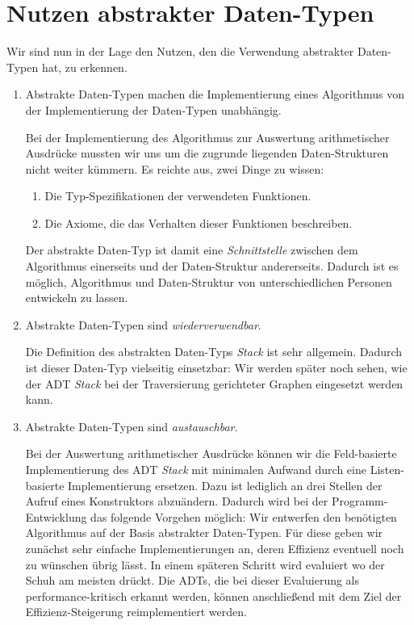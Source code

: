 \section{Nutzen abstrakter Daten-Typen}
Wir sind nun in der Lage den Nutzen, den die Verwendung abstrakter Daten-Typen hat, zu
erkennen. 
\begin{enumerate}
\item Abstrakte Daten-Typen machen die Implementierung eines Algorithmus von der
      Implementierung der Daten-Typen unabh\"angig.

      Bei der Implementierung des Algorithmus zur Auswertung arithmetischer Ausdr\"ucke
      mussten wir uns um die zugrunde liegenden Daten-Strukturen nicht weiter k\"ummern. 
      Es reichte aus, zwei Dinge zu wissen: 
      \begin{enumerate}
      \item Die Typ-Spezifikationen der verwendeten Funktionen.
      \item Die Axiome, die das Verhalten dieser Funktionen beschreiben.
      \end{enumerate}
      Der abstrakte Daten-Typ ist damit eine \emph{Schnittstelle} zwischen dem Algorithmus
      einerseits und der Daten-Struktur andererseits.  Dadurch ist es m\"oglich, Algorithmus
      und Daten-Struktur von unterschiedlichen Personen entwickeln zu lassen.
\item Abstrakte Daten-Typen sind \emph{wiederverwendbar}.

      Die Definition des abstrakten Daten-Typs \emph{Stack} ist sehr allgemein. Dadurch
      ist dieser Daten-Typ vielseitig einsetzbar:  Wir werden sp\"ater noch sehen, wie der
      ADT \emph{Stack} bei der Traversierung gerichteter Graphen eingesetzt werden kann.
\item Abstrakte Daten-Typen sind \emph{austauschbar}.

      Bei der Auswertung arithmetischer Ausdr\"ucke k\"onnen wir die
      Feld-basierte Implementierung des ADT \emph{Stack} mit minimalen Aufwand durch 
      eine Listen-basierte Implementierung ersetzen.  Dazu ist lediglich an drei Stellen
      der Aufruf eines Konstruktors abzu\"andern.
      Dadurch wird bei der
      Programm-Entwicklung das folgende Vorgehen m\"oglich: Wir entwerfen den ben\"otigten
      Algorithmus auf der Basis abstrakter Daten-Typen.  F\"ur diese geben wir zun\"achst sehr
      einfache Implementierungen an, deren Effizienz eventuell noch zu w\"unschen \"ubrig
      l\"asst.  In einem sp\"ateren Schritt wird evaluiert wo der Schuh am meisten dr\"uckt.
      Die ADTs, die bei dieser Evaluierung als performance-kritisch erkannt werden, k\"onnen
      anschlie{\ss}end mit dem Ziel der Effizienz-Steigerung reimplementiert werden.
\end{enumerate}
\pagebreak

